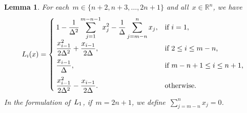 \documentclass[draft]{article}
\numberwithin{equation}{section}
\theoremstyle{definition}
\theoremstyle{plain}
\newtheorem{lemma}{Lemma}[section]
\newcommand{\lagp}[1][]{L\ifblank{#1}{}{_{#1}}}
\newcommand{\R}{\mathbb{R}}
\newcommand{\set}[2][]{#1\{#2#1\}}
\begin{document}
\begin{lemma}
    \label{lem:lagp}
    For each~$m \in \set{n + 2, n + 3, \dots,  2n + 1}$ and all~$x \in \R^n$, we have
    \begin{equation*}
        \lagp[i](x) =
        \begin{cases}
            \displaystyle 1 - \frac{1}{\Delta^2} \sum_{j = 1}^{m - n - 1} x_j^2 - \frac{1}{\Delta} \sum_{j = m - n}^n x_j,  & \text{if~$i = 1$,}\\[2ex]
            \displaystyle \frac{x_{i - 1}^2}{2\Delta^2} + \frac{x_{i - 1}}{2\Delta},                                        & \text{if~$2 \le i \le m - n$,}\\[2ex]
            \displaystyle \frac{x_{i - 1}}{\Delta},                                                                         & \text{if~$m - n + 1 \le i \le n + 1$,}\\[2ex]
            \displaystyle \frac{x_{i - 1}^2}{2\Delta^2} - \frac{x_{i - 1}}{2\Delta}.                                        & \text{otherwise.}
        \end{cases}
    \end{equation*}
    In the formulation of~$\lagp[1]$, if~$m = 2n + 1$, we define~$\sum_{j = m - n}^n x_j = 0$.
\end{lemma}
\end{document}
